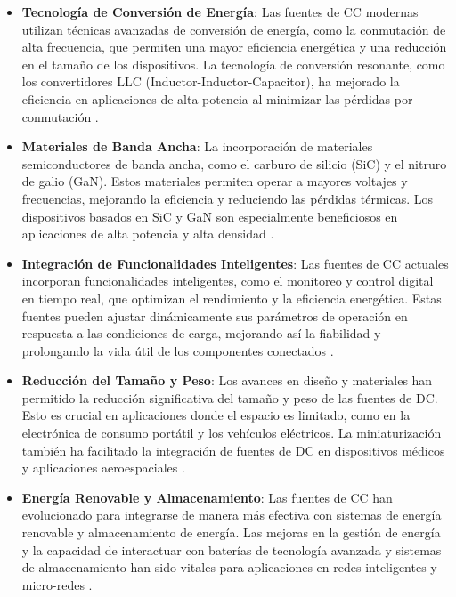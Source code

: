 \begin{itemize}
    \item \textbf{Tecnología de Conversión de Energía}: Las fuentes de CC modernas utilizan técnicas avanzadas de conversión de energía, como la conmutación de alta frecuencia, que permiten una mayor eficiencia energética y una reducción en el tamaño de los dispositivos. La tecnología de conversión resonante, como los convertidores LLC (Inductor-Inductor-Capacitor), ha mejorado la eficiencia en aplicaciones de alta potencia al minimizar las pérdidas por conmutación \cite{zhang2013}.
    \item \textbf{Materiales de Banda Ancha}: La incorporación de materiales semiconductores de banda ancha, como el carburo de silicio (SiC) y el nitruro de galio (GaN). Estos materiales permiten operar a mayores voltajes y frecuencias, mejorando la eficiencia y reduciendo las pérdidas térmicas. Los dispositivos basados en SiC y GaN son especialmente beneficiosos en aplicaciones de alta potencia y alta densidad \cite{palmour2019}.
    \item \textbf{Integración de Funcionalidades Inteligentes}: Las fuentes de CC actuales incorporan funcionalidades inteligentes, como el monitoreo y control digital en tiempo real, que optimizan el rendimiento y la eficiencia energética. Estas fuentes pueden ajustar dinámicamente sus parámetros de operación en respuesta a las condiciones de carga, mejorando así la fiabilidad y prolongando la vida útil de los componentes conectados \cite{brown2020}.
    \item \textbf{Reducción del Tamaño y Peso}: Los avances en diseño y materiales han permitido la reducción significativa del tamaño y peso de las fuentes de DC. Esto es crucial en aplicaciones donde el espacio es limitado, como en la electrónica de consumo portátil y los vehículos eléctricos. La miniaturización también ha facilitado la integración de fuentes de DC en dispositivos médicos y aplicaciones aeroespaciales \cite{kumar2017}.
    \item \textbf{Energía Renovable y Almacenamiento}: Las fuentes de CC han evolucionado para integrarse de manera más efectiva con sistemas de energía renovable y almacenamiento de energía. Las mejoras en la gestión de energía y la capacidad de interactuar con baterías de tecnología avanzada y sistemas de almacenamiento han sido vitales para aplicaciones en redes inteligentes y micro-redes \cite{hoffmann2021}.
\end{itemize}\par 
